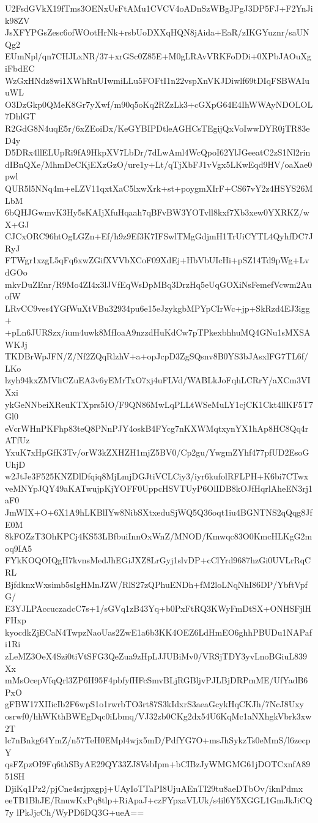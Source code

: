 U2FsdGVkX19fTms3OENxUsFtAMu1CVCV4oADnSzWBgJPgJ3DP5FJ+F2YnJik98ZV
JsXFYPGsZesc6ofWOotHrNk+rsbUoDXXqHQN8jAida+EaR/zIKGYuznr/saUNQg2
EUmNpl/qn7CHJLxNR/37+xrGSc0Z85E+M0gLRAvVRKFoDDi+0XPbJAOuXgiFbdEC
WzGxHNdz8wi1XWhRnUIwmiLLu5FOFtI1n22vspXnVKJDiwlf69tDIqFSBWAIuuWL
O3DzGkp0QMeK8Gr7yXwf/m90q5oKq2RZzLk3+cGXpG64E4IhWWAyNDOLOL7DhlGT
R2GdG8N4uqE5r/6xZEoiDx/KeGYBIPDtleAGHCsTEgijQxVoIwwDYR0jTR83eD4y
D5DRx4llELUpRi9fA9HkpXV7LbDr/7dLwAml4WcQpoI62YlJGeeatC2zS1Nl2rin
dIBnQXe/MhmDeCKjEXzGzO/ure1y+Lt/qTjXbFJ1vVgx5LKwEqd9HV/oaXae0pwl
QUR5l5NNq4m+eLZV11qxtXaC5lxwXrk+st+poygmXIrF+CS67vY2z4HSYS26MLbM
6bQHJGwmvK3Hy5sKAIjXfuHqaah7qBFvBW3YOTvll8kxf7Xb3xew0YXRKZ/wX+GJ
CJCxORC96htOgLGZn+Ef/h9z9Ef3K7IFSwlTMgGdjmH1TrUiCYTL4QyhfDC7JRyJ
FTWgr1xzgL5qFq6xwZGifXVVbXCoF09XdEj+HbVbUIcHi+pSZ14Td9pWg+LvdGOo
mkvDuZEnr/R9Mo4ZI4x3lJVfEqWsDpMBq3DrzHq5eUqGOXiNsFemefVcwm2AuofW
LRvCC9ves4YGfWuXtVBu32934pu6e15eJzykgbMPYpCIrWc+jp+SkRzd4EJ3igg+
+pLn6JURSzx/ium4uwk8MfIoaA9nzzdHuKdCw7pTPkexbhhuMQ4GNu1sMXSAWKJj
TKDBrWpJFN/Z/Nf2ZQqRlzhV+a+opJcpD3ZgSQsnv8B0YS3bJAsxlFG7TL6f/LKo
lzyh94kxZMVliCZuEA3v6yEMrTxO7xj4uFLVd/WABLkJoFqhLCRrY/aXCm3VIXxi
ykGeNNbeiXReuKTXprs5IO/F9QN86MwLqPLLtWSeMuLY1cjCK1Ckt4llKF5T7Gl0
eVcrWHnPKFhp83teQ8PNnPJY4oskB4FYcg7nKXWMqtxynYX1hAp8HC8Qq4rATfUz
YxuK7xHpGfK3Tv/orW3kZXHZH1mjZ5BV0/Cp2gu/YwgmZYhf477pfUD2EsoGUhjD
w2JtJe3F525KNZDlDfqiq8MjLmjDGJtiVCLCiy3/iyr6kufolRFLPH+K6bi7CTwx
veMNYpJQY49aKATwujpKjYOFF0UppcHSVTUyP6OlIDB8kOJfHqrlAheEN3rj1aF0
JmWIX+O+6X1A9hLKBlIYw8NibSXtxeduSjWQ5Q36oqt1iu4BGNTNS2qQqg8JfE0M
8kFOZzT3OhKPCj4KS53LBfbuiInnOxWnZ/MNOD/Kmwqc83O0KmcHLKgG2moq9IA5
FYkKOQOIQgH7kvnsMedJhEGiJXZ8LrGyj1slvDP+cClYrd9687hzGi0UVLrRqCRL
BjfdknxWxsimb5sIgHMnJZW/RlS27zQPhuENDh+fM2loLNqNhI86DP/YbftVpfG/
E3YJLPAccuczadcC7s+1/sGVq1zB43Yq+b0PxFtRQ3KWyFmDtSX+ONHSFjlHFHxp
kyocdkZjECaN4TwpzNaoUas2ZwE1a6b3KK4OEZ6LdHmEO6ghhPBUDu1NAPafi1Ri
zLeMZ3OeX4Szi0tiVtSFG3QeZua9zHpLJJUBiMv0/VRSjTDY3yvLnoBGiuL839Xx
mMsOcepVfqQrl3ZP6H95F4pbfyfHFcSmvBLjRGBljvPJLBjDRPmME/UfYadB6PxO
gFBW17XIIicIb2F6wpS1o1rwrbTO3rt87S3kIdxrS3aeaGcykHqCKJh/7NcJ8Uxy
osrwf0/hhWKthBWEgDqc0iLbmq/VJ32zb0CKg2dx54U6KqMc1aNXhgkVbrk3xw2T
lc7nBnkg64YmZ/n57TeH0EMpl4wjx5mD/PdfYG7O+msJhSykzTs0eMmS/l6zecpY
qsFZpzOI9Fq6thSByAE29QY33ZJ8VsbIpm+bCIBzJyWMGMG61jDOTCxnfA8951SH
DjiKq1Pz2/pjCne4srjpxgpj+UAyIoTTaPI8UjuAEnTI29tu8aeDTbOv/iknPdmx
eeTB1BhJE/RnuwKxPq8tlp+RiApaJ+czFYpxaVLUk/s4il6Y5XGGL1GmJkJiCQ7y
lPkJjcCh/WyPD6DQ3G+ueA==
